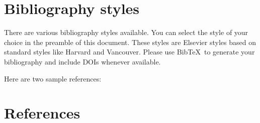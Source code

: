 \documentclass[review]{elsarticle}
\begin{document}
\section{Bibliography styles}

There are various bibliography styles available. You can select the style of your choice in the preamble of this document. These styles are Elsevier styles based on standard styles like Harvard and Vancouver. Please use Bib\TeX\ to generate your bibliography and include DOIs whenever available.

Here are two sample references: \citep{mesoudi_cultural_2015}

\section*{References}

%

\end{document}
